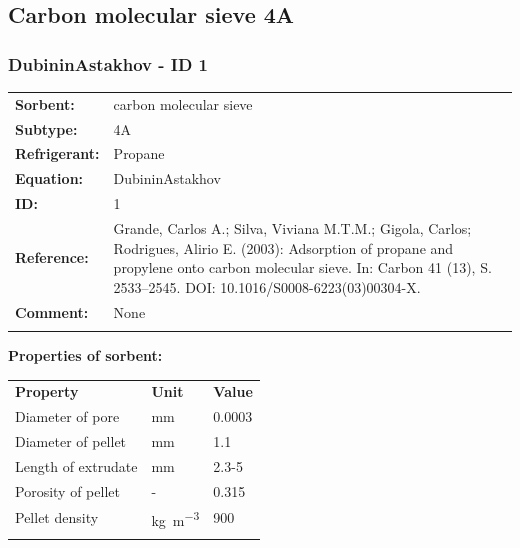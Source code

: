 \subsection{Carbon molecular sieve 4A}
%
\subsubsection{DubininAstakhov - ID 1}
%
\begin{tabular}[l]{|lp{11.5cm}|}
\hline
\addlinespace

\textbf{Sorbent:} & carbon molecular sieve \\
\textbf{Subtype:} & 4A \\
\textbf{Refrigerant:} & Propane \\
\textbf{Equation:} & DubininAstakhov \\
\textbf{ID:} & 1 \\
\textbf{Reference:} & Grande, Carlos A.; Silva, Viviana M.T.M.; Gigola, Carlos; Rodrigues, Alirio E. (2003): Adsorption of propane and propylene onto carbon molecular sieve. In: Carbon 41 (13), S. 2533–2545. DOI: 10.1016/S0008-6223(03)00304-X. \\
\textbf{Comment:} & None \\

\addlinespace
\hline
\end{tabular}
\newline

\textbf{Properties of sorbent:}
\newline
%
\begin{longtable}[l]{lll}
\toprule
\addlinespace
\textbf{Property} & \textbf{Unit} & \textbf{Value} \\
\addlinespace
\midrule
\endhead
\bottomrule
\endfoot
\bottomrule
\endlastfoot
\addlinespace

Diameter of pore & \si{\milli\meter} & 0.0003\\
Diameter of pellet & \si{\milli\meter} & 1.1\\
Length of extrudate & \si{\milli\meter} & 2.3-5\\
Porosity of pellet & - & 0.315\\
Pellet density & \si{\kilogram\per\cubic\meter} & 900\\

\addlinespace\end{longtable}

